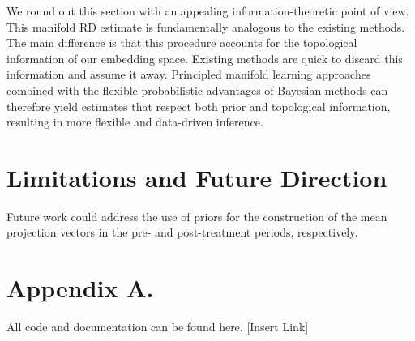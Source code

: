 \documentclass[twoside,11pt]{article}
\begin{document}
We round out this section with an appealing information-theoretic point of view. This manifold RD estimate is fundamentally analogous to the existing methods. The main difference is that this procedure accounts for the topological information of our embedding space. Existing methods are quick to discard this information and assume it away. Principled manifold learning approaches combined with the flexible probabilistic advantages of Bayesian methods can therefore yield estimates that respect both prior and topological information, resulting in more flexible and data-driven inference.

\section{Limitations and Future Direction}

Future work could address the use of priors for the construction of the mean projection vectors in the pre- and post-treatment periods, respectively. 

\newpage

\appendix
\section*{Appendix A.} \label{sc:app_a}
All code and documentation can be found here. [Insert Link]

\newpage 

\end{document}
